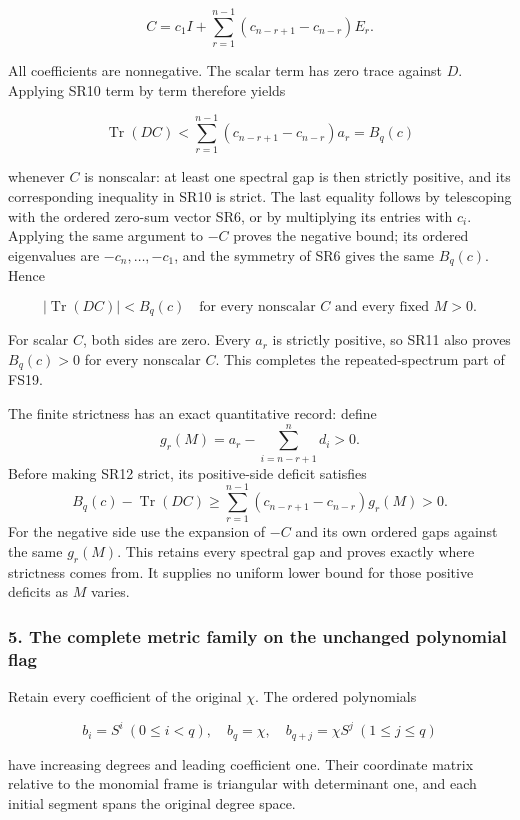 \[
C=c_1I+\sum_{r=1}^{n-1}
(c_{n-r+1}-c_{n-r})E_r.
\tag{SR11}
\]

All coefficients are nonnegative. The scalar term has zero trace against \(D\). Applying SR10 term by term therefore yields

\[
\operatorname{Tr}(DC)
<\sum_{r=1}^{n-1}(c_{n-r+1}-c_{n-r})a_r=B_q(c)
\tag{SR12}
\]

whenever \(C\) is nonscalar: at least one spectral gap is then strictly positive, and its corresponding inequality in SR10 is strict. The last equality follows by telescoping with the ordered zero-sum vector SR6, or by multiplying its entries with \(c_i\). Applying the same argument to \(-C\) proves the negative bound; its ordered eigenvalues are \(-c_n,\ldots,-c_1\), and the symmetry of SR6 gives the same \(B_q(c)\). Hence

\[
|\operatorname{Tr}(DC)|<B_q(c)
\quad\text{for every nonscalar \(C\) and every fixed \(M>0\)}.
\tag{SR13}
\]

For scalar \(C\), both sides are zero. Every \(a_r\) is strictly positive, so SR11 also proves \(B_q(c)>0\) for every nonscalar \(C\). This completes the repeated-spectrum part of FS19.

The finite strictness has an exact quantitative record: define \[
g_r(M)=a_r-\sum_{i=n-r+1}^{n}d_i>0.
\tag{SR14}
\] Before making SR12 strict, its positive-side deficit satisfies \[
B_q(c)-\operatorname{Tr}(DC)
\ge\sum_{r=1}^{n-1}(c_{n-r+1}-c_{n-r})g_r(M)>0.
\tag{SR15}
\] For the negative side use the expansion of \(-C\) and its own ordered gaps against the same \(g_r(M)\). This retains every spectral gap and proves exactly where strictness comes from. It supplies no uniform lower bound for those positive deficits as \(M\) varies.

\subsubsection{5. The complete metric family on the unchanged polynomial flag}\label{endpoint-four_window_sharpness_review--the-complete-metric-family-on-the-unchanged-polynomial-flag}

Retain every coefficient of the original \(\chi\). The ordered polynomials

\[
b_i=S^i\ (0\le i<q),\quad b_q=\chi,\quad
b_{q+j}=\chi S^j\ (1\le j\le q)
\tag{SR16}
\]

have increasing degrees and leading coefficient one. Their coordinate matrix relative to the monomial frame is triangular with determinant one, and each initial segment spans the original degree space.

